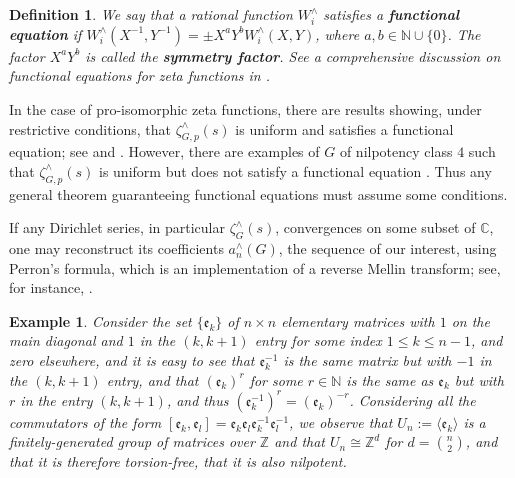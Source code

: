 \documentclass{article}
\newtheorem{definition}[theorem]{Definition}
\newtheorem{example}[theorem]{Example}
\newcommand{\e}{\mathfrak{e}}
\begin{document}
\begin{definition}
We say that a rational function $W_{i}^{\wedge}$ satisfies a \textbf{functional equation} if $W_{i}^{\wedge}(X^{-1},Y^{-1})=\pm{X}^{a}{Y}^{b}{W_{i}^{\wedge}(X,Y)}$, where $a,b\in\mathbb{N}\cup\{0\}$. The factor $X^{a}Y^{b}$ is called the \textbf{symmetry factor}. See a comprehensive discussion on functional equations for zeta functions in \cite{Voll}.
\end{definition}

In the case of pro-isomorphic zeta functions, there are results showing, under restrictive conditions, that $\zeta_{G,p}^{\wedge}(s)$ is uniform and satisfies a functional equation; see \cite[Theorem B]{DuSautoyLubotzky} and \cite[Theorem 1.1]{Berman}. However, there are examples of $G$ of nilpotency class $4$ such that $\zeta_{G,p}^{\wedge}(s)$ is uniform but does not satisfy a functional equation \cite[Theorem 1.1]{BermanKlopsch}. Thus any general theorem guaranteeing functional equations must assume some conditions.

If any Dirichlet series, in particular $\zeta_{G}^{\wedge}(s)$, convergences on some subset of $\mathbb{C}$, one may reconstruct its coefficients $a_{n}^{\wedge}(G)$, the sequence of our interest, using Perron's formula, which is an implementation of a reverse Mellin transform; see, for instance, \cite[Theorem 5.1]{MontgomeryVaughan}.\par

\begin{example}
Consider the set $\{\e_k\}$ of $n\times{n}$ elementary matrices with $1$ on the main diagonal and $1$ in the $(k,k+1)$ entry for some index $1\leq{k}\leq{n}-1$, and zero elsewhere, and it is easy to see that $\e_k^{-1}$ is the same matrix but with $-1$ in the $(k,k+1)$ entry, and that $(\e_k)^r$ for some $r\in\mathbb{N}$ is the same as $\e_k$ but with $r$ in the entry $(k,k+1)$, and thus $(\e_k^{-1})^r=(\e_k)^{-r}$. Considering all the commutators of the form $[\e_k,\e_l]=\e_k\e_l\e_k^{-1}\e_l^{-1}$, we observe that $U_n:=\langle{\e_k}\rangle$ is a finitely-generated group of matrices over $\mathbb{Z}$ and that $U_n\cong\mathbb{Z}^d$ for $d=\binom{n}{2}$, and that it is therefore torsion-free, that it is also nilpotent.
\end{example}
\end{document}
